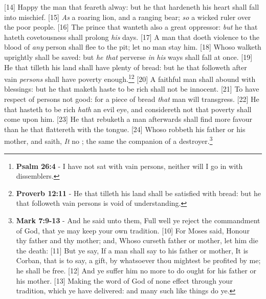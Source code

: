 [14] \textcolor[cmyk]{0.99998,1,0,0}{Happy  the man that feareth alway: but he that hardeneth his heart shall fall into mischief.}
[15] \textcolor[cmyk]{0.99998,1,0,0}{\emph{As} a roaring lion, and a ranging bear; \emph{so}  a wicked ruler over the poor people.}
[16] \textcolor[cmyk]{0.99998,1,0,0}{The prince that wanteth   also a great oppressor: \emph{but} he that hateth covetousness shall prolong \emph{his} days.}
[17] \textcolor[cmyk]{0.99998,1,0,0}{A man that doeth violence to the blood of \emph{any} person shall flee to the pit; let no man stay him.}
[18] \textcolor[cmyk]{0.99998,1,0,0}{Whoso walketh uprightly shall be saved: but \emph{he} \emph{that}  perverse \emph{in} \emph{his} ways shall fall at once.}
[19] \textcolor[cmyk]{0.99998,1,0,0}{He that tilleth his land shall have plenty of bread: but he that followeth after vain \emph{persons} shall have poverty enough.}\footnote{\textbf{Psalm 26:4} -  I have not sat with vain persons, neither will I go in with dissemblers.}\footnote{\textbf{Proverb 12:11} - He that tilleth his land shall be satisfied with bread: but he that followeth vain persons is void of understanding.}
[20] \textcolor[cmyk]{0.99998,1,0,0}{A faithful man shall abound with blessings: but he that maketh haste to be rich shall not be innocent.}
[21] \textcolor[cmyk]{0.99998,1,0,0}{To have respect of persons  not good: for  a piece of bread \emph{that} man will transgress.}
[22] \textcolor[cmyk]{0.99998,1,0,0}{He that hasteth to be rich \emph{hath} an evil eye, and considereth not that poverty shall come upon him.}
[23] \textcolor[cmyk]{0.99998,1,0,0}{He that rebuketh a man afterwards shall find more favour than he that flattereth with the tongue.}
[24] \textcolor[cmyk]{0.99998,1,0,0}{Whoso robbeth his father or his mother, and saith, \emph{It}  no ; the same  the companion of a destroyer.}\footnote{\textbf{Mark 7:9-13} - And he said unto them, Full well ye reject the commandment of God, that ye may keep your own tradition. [10] For Moses said, Honour thy father and thy mother; and, Whoso curseth father or mother, let him die the death: [11] But ye say, If a man shall say to his father or mother, It is Corban, that is to say, a gift, by whatsoever thou mightest be profited by me; he shall be free. [12] And ye suffer him no more to do ought for his father or his mother. [13] Making the word of God of none effect through your tradition, which ye have delivered: and many such like things do ye.}
